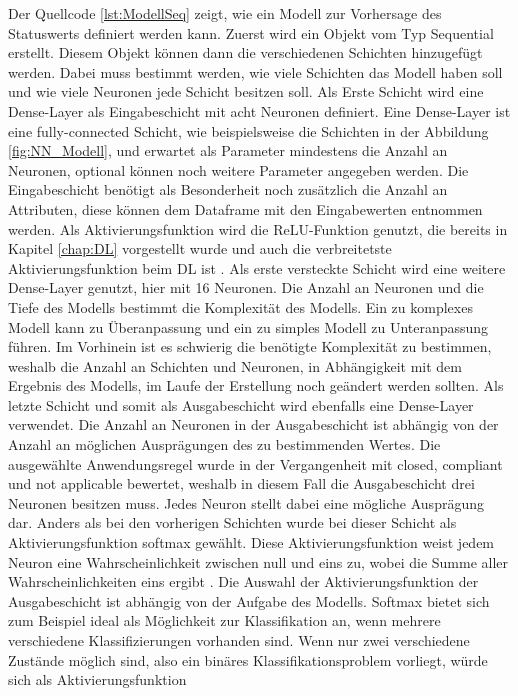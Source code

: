 Der Quellcode \ref{lst:ModellSeq} zeigt, wie ein Modell zur Vorhersage des Statuswerts definiert werden kann. Zuerst wird ein Objekt vom Typ Sequential erstellt. Diesem Objekt 
können dann die verschiedenen Schichten hinzugefügt werden. Dabei muss bestimmt werden, wie viele Schichten das Modell haben soll und wie viele Neuronen jede Schicht besitzen soll.
Als Erste Schicht wird eine Dense-Layer als Eingabeschicht mit acht Neuronen definiert. Eine Dense-Layer ist eine fully-connected Schicht,
wie beispielsweise die Schichten in der Abbildung \ref{fig:NN_Modell}, und erwartet als Parameter mindestens die Anzahl an Neuronen, optional können noch weitere Parameter angegeben werden.
Die Eingabeschicht benötigt als Besonderheit noch zusätzlich die Anzahl an Attributen, diese können dem Dataframe mit den Eingabewerten entnommen werden. Als Aktivierungsfunktion wird
die \ac{ReLU}-Funktion genutzt, die bereits in Kapitel \ref{chap:DL} vorgestellt wurde und auch die verbreitetste Aktivierungsfunktion beim \ac{DL} ist \cite[vgl. S.102]{DL_PY}. 
Als erste versteckte Schicht wird eine weitere Dense-Layer genutzt, hier mit 16 Neuronen. 
Die Anzahl an Neuronen und die Tiefe des Modells bestimmt die Komplexität des Modells. Ein zu komplexes Modell kann zu Überanpassung und ein zu simples Modell zu Unteranpassung führen.
Im Vorhinein ist es schwierig die benötigte Komplexität zu bestimmen, weshalb die Anzahl an Schichten und Neuronen, in Abhängigkeit mit dem Ergebnis des Modells, im Laufe der Erstellung noch geändert 
werden sollten. Als letzte Schicht und somit als Ausgabeschicht wird ebenfalls eine Dense-Layer verwendet. Die Anzahl an Neuronen in der Ausgabeschicht ist abhängig von der Anzahl an 
möglichen Ausprägungen des zu bestimmenden Wertes. Die ausgewählte Anwendungsregel wurde in der Vergangenheit mit \glqq closed\grqq{}, \glqq compliant\grqq{} und \glqq not applicable\grqq{} bewertet,
weshalb in diesem Fall die Ausgabeschicht drei Neuronen besitzen muss. Jedes Neuron stellt dabei eine mögliche Ausprägung dar. Anders als bei den vorherigen Schichten wurde bei dieser Schicht 
als Aktivierungsfunktion \glqq softmax\grqq{} gewählt. Diese Aktivierungsfunktion weist jedem Neuron eine Wahrscheinlichkeit zwischen null und eins zu, wobei die Summe aller Wahrscheinlichkeiten 
eins ergibt \cite{KerasDoc}. Die Auswahl der Aktivierungsfunktion der Ausgabeschicht ist abhängig von der Aufgabe des Modells. \glqq Softmax\grqq{} bietet sich zum Beispiel ideal als Möglichkeit zur Klassifikation an,
wenn mehrere verschiedene Klassifizierungen vorhanden sind. Wenn nur zwei verschiedene Zustände möglich sind, also ein binäres Klassifikationsproblem vorliegt, würde sich als Aktivierungsfunktion
